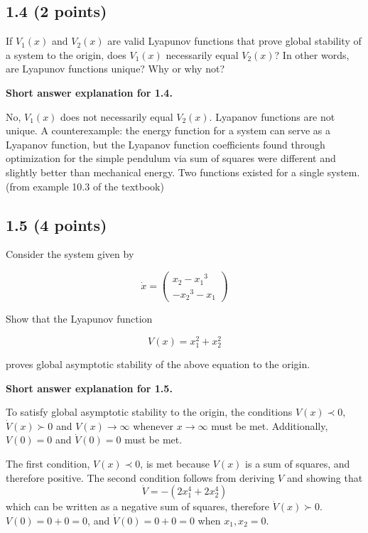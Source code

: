 \documentclass[11pt]{article}
\begin{document}
    \subsection{1.4 (2 points)}\label{points}

If \(V_1(x)\) and \(V_2(x)\) are valid Lyapunov functions that prove
global stability of a system to the origin, does \(V_1(x)\) necessarily
equal \(V_2(x)\)? In other words, are Lyapunov functions unique? Why or
why not?

    \textbf{Short answer explanation for 1.4.}

No, \(V_1(x)\) does not necessarily equal \(V_2(x)\). Lyapanov functions
are not unique. A counterexample: the energy function for a system can
serve as a Lyapanov function, but the Lyapanov function coefficients
found through optimization for the simple pendulum via sum of squares
were different and slightly better than mechanical energy. Two functions
existed for a single system. (from example 10.3 of the textbook)

    \subsection{1.5 (4 points)}\label{points}

Consider the system given by

\begin{equation}
\dot{x}= \left(\begin{array}{c} {x_2} - {{x_1}}^3\\  - {{x_2}}^3 - {x_1} \end{array}\right)\label{p2System}
\end{equation}

Show that the Lyapunov function

\[
V(x) = x_1^2 + x_2^2 
\]

proves global asymptotic stability of the above equation to the origin.

    \textbf{Short answer explanation for 1.5.}

To satisfy global asymptotic stability to the origin, the conditions
\(V(x) \prec 0\), \(\dot{V}(x) \succ 0\) and \(V(x) \to\infty\) whenever
\(x \to\infty\) must be met. Additionally, \(V(0) = 0\) and
\(\dot{V}(0) = 0\) must be met.

The first condition, \(V(x) \prec 0\), is met because \(V(x)\) is a sum
of squares, and therefore positive. The second condition follows from
deriving \(V\) and showing that \[\dot{V} =  -(2x_1^4 + 2x_2^4)\] which
can be written as a negative sum of squares, therefore
\(\dot{V}(x) \succ 0\). \(V(0) = 0 + 0 = 0\), and
\(\dot{V}(0) = 0 + 0 = 0\) when \(x_1, x_2 = 0\).
\end{document}
